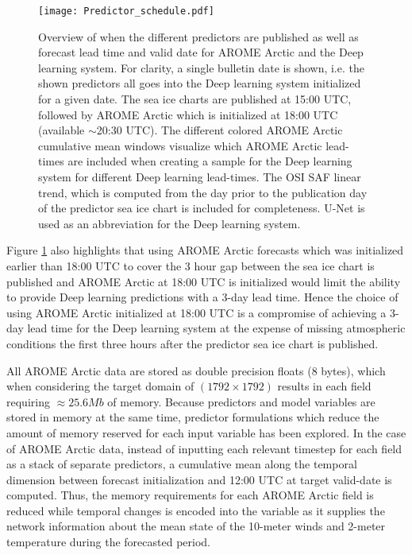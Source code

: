 \documentclass[../main/thesis]{subfiles}
\begin{document}
\begin{figure}
    \centering
    \texttt{[image: Predictor\_schedule.pdf]}
    \caption{\label{fig:pred_schedule}Overview of when the different predictors are published as well as forecast lead time and valid date for AROME Arctic and the Deep learning system. For clarity, a single bulletin date is shown, i.e. the shown predictors all goes into the Deep learning system initialized for a given date. The sea ice charts are published at 15:00 UTC, followed by AROME Arctic which is initialized at 18:00 UTC (available $\sim$20:30 UTC). The different colored AROME Arctic cumulative mean windows visualize which AROME Arctic lead-times are included when creating a sample for the Deep learning system for different Deep learning lead-times. The OSI SAF linear trend, which is computed from the day prior to the publication day of the predictor sea ice chart is included for completeness. U-Net is used as an abbreviation for the Deep learning system.}
\end{figure}

Figure \ref{fig:pred_schedule} also highlights that using AROME Arctic forecasts which was initialized earlier than 18:00 UTC to cover the 3 hour gap between the sea ice chart is published and AROME Arctic at 18:00 UTC is initialized would limit the ability to provide Deep learning predictions with a 3-day lead time. Hence the choice of using AROME Arctic initialized at 18:00 UTC is a compromise of achieving a 3-day lead time for the Deep learning system at the expense of missing atmospheric conditions the first three hours after the predictor sea ice chart is published.

All AROME Arctic data are stored as double precision floats (8 bytes), which when considering the target domain of $(1792 \times 1792)$ results in each field requiring $\approx 25.6 Mb$ of memory. Because predictors and model variables are stored in memory at the same time, predictor formulations which reduce the amount of memory reserved for each input variable has been explored. In the case of AROME Arctic data, instead of inputting each relevant timestep for each field as a stack of separate predictors, a cumulative mean along the temporal dimension between forecast initialization and 12:00 UTC at target valid-date is computed. Thus, the memory requirements for each AROME Arctic field is reduced while temporal changes is encoded into the variable as it supplies the network information about the mean state of the 10-meter winds and 2-meter temperature during the forecasted period. 
\end{document}
